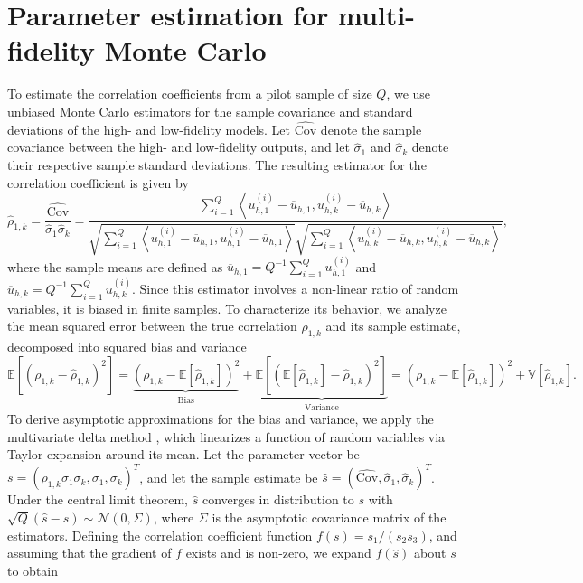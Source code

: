 \section{Parameter estimation for multi-fidelity Monte Carlo}\label{sec:Parameter_Estimation}

To estimate the correlation coefficients from a pilot sample of size $Q$, we use unbiased Monte Carlo estimators for the sample covariance and standard deviations of the high- and low-fidelity models. Let $\widehat{\text{Cov}}$ denote the sample covariance between the high- and low-fidelity outputs, and let $\widehat\sigma_1$ and $\widehat\sigma_k$ denote their respective sample standard deviations. The resulting estimator for the correlation coefficient is given by
%
\[
\widehat\rho_{1,k} = \frac{\widehat{\text{Cov}}}{\widehat\sigma_1 \widehat\sigma_k} = \frac{\sum_{i=1}^Q\left\langle u_{h,1}^{(i)} - \overline{u}_{h,1},  u_{h,k}^{(i)} - \overline{u}_{h,k} \right\rangle}{\sqrt{\sum_{i=1}^Q \left\langle u_{h,1}^{(i)} - \overline{u}_{h,1}, u_{h,1}^{(i)} - \overline{u}_{h,1} \right\rangle} \sqrt{\sum_{i=1}^Q \left\langle u_{h,k}^{(i)} - \overline{ u}_{h,k}, u_{h,k}^{(i)} - \overline{u}_{h,k} \right\rangle}},
\]
%
where the sample means are defined as $\overline{u}_{h,1} = Q^{-1}\sum_{i=1}^Q u_{h,1}^{(i)}$ and $\overline{  u}_{h,k} = Q^{-1}\sum_{i=1}^Q u_{h,k}^{(i)}$. Since this estimator involves a non-linear ratio of random variables, it is biased in finite samples. To characterize its behavior, we analyze the mean squared error between the true correlation $\rho_{1,k}$ and its sample estimate, decomposed into squared bias and variance
%
\begin{equation}
\label{eq:MSE_rho}
    \mathbb{E}\left[\left(\rho_{1,k} - \widehat\rho_{1,k}\right)^2\right]= \underbrace{\left(\rho_{1,k} - \mathbb{E}\left[\widehat\rho_{1,k}\right]\right)^2}_{\text{Bias}}+\underbrace{\mathbb{E}\left[\left( \mathbb{E}\left[\widehat\rho_{1,k}\right]-\widehat\rho_{1,k}\right)^2\right]}_{\text{Variance}}=\left(\rho_{1,k} - \mathbb{E}\left[\widehat\rho_{1,k}\right]\right)^2+\mathbb{V}\left[\widehat\rho_{1,k}\right].
\end{equation}
%
To derive asymptotic approximations for the bias and variance, we apply the multivariate delta method \cite{Cr:1946,Oe:1992}, which linearizes a function of random variables via Taylor expansion around its mean. Let the parameter vector be $s = (\rho_{1,k}\sigma_1\sigma_k, \sigma_1, \sigma_k)^T$, and let the sample estimate be $\widehat s = (\widehat{\text{Cov}}, \widehat\sigma_1, \widehat\sigma_k)^T$. Under the central limit theorem, $\widehat s$ converges in distribution to $s$ with $\sqrt{Q}(\widehat s-s)\sim \mathcal{N}(0,\Sigma)$, where $\Sigma$ is the asymptotic covariance matrix of the estimators. Defining the correlation coefficient function $f(s) = s_1 / (s_2 s_3)$, and assuming that the gradient of $f$ exists and is non-zero, we expand $f(\widehat s)$ about $s$ to obtain
